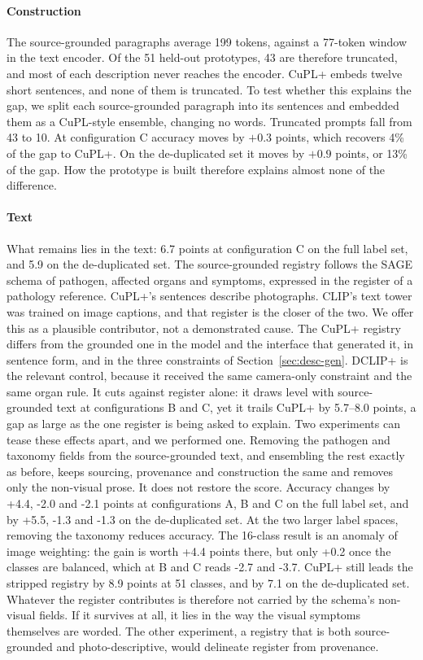 \documentclass[a4paper,fleqn]{cas-dc}
\begin{document}
\paragraph{Construction} The source-grounded paragraphs average 199 tokens, against a 77-token
window in the text encoder. Of the 51 held-out prototypes, 43 are therefore truncated, and most of
each description never reaches the encoder. CuPL+ embeds twelve short sentences, and none of them
is truncated. To test whether this explains the gap, we split each source-grounded paragraph into
its sentences and embedded them as a CuPL-style ensemble, changing no words. Truncated prompts fall
from 43 to 10. At configuration C accuracy moves by $+0.3$ points, which recovers 4\% of the gap to
CuPL+. On the de-duplicated set it moves by $+0.9$ points, or 13\% of the gap. How the prototype is
built therefore explains almost none of the difference.

\paragraph{Text} What remains lies in the text: 6.7 points at configuration C on the full label
set, and 5.9 on the de-duplicated set. The source-grounded registry follows the SAGE schema of
pathogen, affected organs and symptoms, expressed in the register of a pathology reference. CuPL+'s
sentences describe photographs. CLIP's text tower was trained on image captions, and that register
is the closer of the two. We offer this as a plausible contributor, not a demonstrated cause. The
CuPL+ registry differs from the grounded one in the model and the interface that generated it, in
sentence form, and in the three constraints of Section~\ref{sec:desc-gen}. DCLIP+ is the relevant
control, because it received the same camera-only constraint and the same organ rule. It cuts
against register alone: it draws level with source-grounded text at configurations B and C, yet it
trails CuPL+ by 5.7--8.0 points, a gap as large as the one register is being asked to explain. Two experiments can tease these effects apart, and we performed one. Removing the pathogen and
taxonomy fields from the source-grounded text, and ensembling the rest exactly as before, keeps
sourcing, provenance and construction the same and removes only the non-visual prose. It does not
restore the score. Accuracy changes by +4.4, -2.0 and -2.1 points at configurations A, B and C on
the full label set, and by +5.5, -1.3 and -1.3 on the de-duplicated set. At the two larger label
spaces, removing the taxonomy reduces accuracy. The 16-class result is an anomaly of image
weighting: the gain is worth +4.4 points there, but only +0.2 once the classes are balanced, which
at B and C reads -2.7 and -3.7. CuPL+ still leads the stripped registry by 8.9 points at 51
classes, and by 7.1 on the de-duplicated set. Whatever the register contributes is therefore not
carried by the schema's non-visual fields. If it survives at all, it lies in the way the visual
symptoms themselves are worded. The other experiment, a registry that is both source-grounded and
photo-descriptive, would delineate register from provenance.
\end{document}
